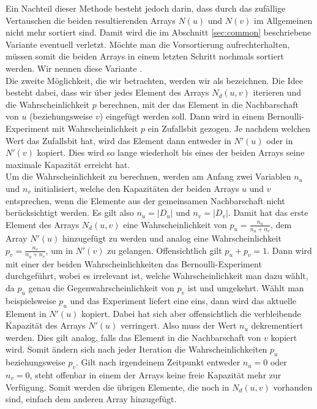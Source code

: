 Ein Nachteil dieser Methode besteht jedoch darin, dass durch das zufällige Vertauschen die beiden resultierenden Arrays
$N(u)$ und $N(v)$ im Allgemeinen nicht mehr sortiert sind. 
Damit wird die im Abschnitt \ref{sec:common} beschriebene
Variante eventuell verletzt. Möchte man die Vorsortierung aufrechterhalten, müssen somit die beiden Arrays
in einem letzten Schritt nochmals sortiert werden.
Wir nennen diese Variante \perm.
\\

Die zweite Möglichkeit, die wir betrachten, werden wir als \distr{} bezeichnen.
Die Idee besteht dabei, dass wir über jedes Element des Arrays $N_{d}(u,v)$ iterieren und 
die Wahrscheinlichkeit $p$ berechnen, mit
der das Element in die Nachbarschaft von $u$ (beziehungsweise $v$) eingefügt werden soll. Dann wird in einem 
Bernoulli-Experiment mit Wahrscheinlichkeit $p$ ein Zufallsbit gezogen. Je nachdem welchen
Wert das Zufallsbit hat, wird das Element dann entweder in $N'(u)$ oder in $N'(v)$ kopiert. Dies wird so lange
wiederholt bis eines der beiden Arrays seine maximale Kapazität erreicht hat. 
\\

Um die Wahrscheinlichkeit zu berechnen, werden am Anfang zwei Variablen $n_u$ und $n_v$ initialisiert, 
welche den Kapazitäten der beiden Arrays $u$ und $v$ entsprechen, wenn die Elemente aus der 
gemeinsamen Nachbarschaft nicht berücksichtigt werden. Es gilt also $n_u = |D_{u}|$ und
$n_v= |D_{v}|$.
Damit hat das erste Element des Arrays $N_{d}(u,v)$ eine Wahrscheinlichkeit von $p_u = \frac{n_u}{n_u+n_v}$, dem
Array $N'(u)$ hinzugefügt zu werden und analog eine Wahrscheinlichkeit $p_v = \frac{n_v}{n_u+n_v}$, um
in $N'(v)$ zu gelangen. Offensichtlich gilt $p_u + p_v = 1$. Dann wird mit einer der beiden
Wahrscheinlichkeiten das Bernoulli-Experiment durchgeführt, wobei es irrelevant ist, welche Wahrscheinlichkeit
man dazu wählt, da $p_u$ genau die Gegenwahrscheinlichkeit von $p_v$ ist und umgekehrt. 
Wählt man beispielsweise $p_u$ und das Experiment liefert eine eins, dann wird das aktuelle Element
in $N'(u)$ kopiert. Dabei
hat sich aber offensichtlich die verbleibende Kapazität des Arrays $N'(u)$ verringert. Also muss
der Wert $n_u$ dekrementiert werden. Dies gilt analog, falls das Element in die Nachbarschaft von $v$ kopiert wird.
Somit ändern sich nach jeder Iteration die Wahrscheinlichkeiten $p_u$ beziehungsweise $p_v$.
Gilt nach irgendeinem Zeitpunkt entweder $n_u = 0$ oder $n_v = 0$, steht offenbar in einem der Arrays 
keine freie Kapazität mehr zur Verfügung. Somit werden die übrigen Elemente, die noch in $N_{d}(u,v)$ vorhanden sind, 
einfach dem anderen Array hinzugefügt.
\\

